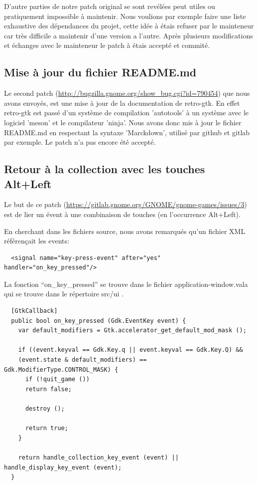 \documentclass[12pt]{report}
\begin{document}
D'autre parties de notre patch original se sont revélées peut utiles ou pratiquement
impossible à maintenir. Nous voulions par exemple faire une liste exhaustive des
dépendances du projet, cette idée à étais refuser par le mainteneur car très
difficile a maintenir d'une version a l'autre.
Après plusieurs modifications et échanges avec le mainteneur le patch à étais
accepté et commité.

\subsection{Mise à jour du fichier README.md}
\label{README}
Le second patch (\url{http://bugzilla.gnome.org/show_bug.cgi?id=790454}) 
que nous avons envoyés, est une mise à jour de la documentation de retro-gtk.
En effet retro-gtk est passé d'un système de compilation 'autotools' à un
système avec le logiciel 'meson' et le compilateur 'ninja'.
Nous avons donc mis à jour le fichier README.md en respectant la syntaxe
'Marckdown', utilisé par github et gitlab par exemple.
Le patch n'a pas encore été accepté.

\subsection{Retour à la collection avec les touches Alt+Left}
Le but de ce patch (\url{https://gitlab.gnome.org/GNOME/gnome-games/issues/3})
est de lier un évent à une combinaison de touches (en l’occurrence Alt+Left).

En cherchant dans les fichiers source, nous avons remarqués qu'un
fichier XML référençait les events:

\begin{verbatim}
  <signal name="key-press-event" after="yes" handler="on_key_pressed"/>
\end{verbatim}

La fonction ``on\_key\_pressed'' se trouve dans le fichier
application-window.vala qui se trouve dans le répertoire src/ui .

\begin{verbatim}
  [GtkCallback]
  public bool on_key_pressed (Gdk.EventKey event) {
    var default_modifiers = Gtk.accelerator_get_default_mod_mask ();

    if ((event.keyval == Gdk.Key.q || event.keyval == Gdk.Key.Q) &&
    (event.state & default_modifiers) == Gdk.ModifierType.CONTROL_MASK) {
      if (!quit_game ())
      return false;

      destroy ();

      return true;
    }

    return handle_collection_key_event (event) || handle_display_key_event (event);
  }
\end{verbatim}
\end{document}
